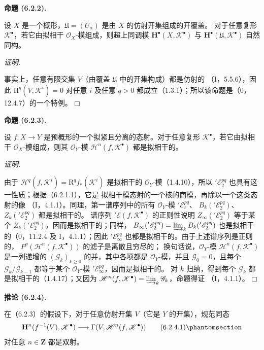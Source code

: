 \documentclass[UTF8,fontset=none,11pt,oneside,openany]{ctexbook}
\providecommand{\square}{\mdlgwhtsquare}
\newenvironment{proposition}[1][]{%
  \par\medskip\noindent\textbf{命题 (#1).}\ %
}{\par}
\newenvironment{corollary}[1][]{%
  \par\medskip\noindent\textbf{推论 (#1).}\ %
}{\par}
\newenvironment{proof}{%
  \par\smallskip\noindent\textit{证明.}\ %
}{\hfill$\square$\par}
\newcommand{\oldpage}[2][]{%
  \hypertarget{ega-source-page-#1-#2}{}%
  \marginnote{\scriptsize\textbf{#1}~|~#2}\ignorespaces}
\let\EGAOriginalLabel\label
\renewcommand{\label}[1]{\phantomsection\EGAOriginalLabel{#1}}
\begin{document}
\begin{proposition}[6.2.2]
设 $X$ 是一个概形，$\mathfrak U=(U_\alpha)$ 是由 $X$ 的仿射开集组成的开覆盖。
对于任意复形 $\mathscr K^\bullet$，若它由拟相干 $\mathscr O_X$-模组成，则超上同调模
$\mathbf H^\bullet(X,\mathscr K^\bullet)$ 与
$\mathbf H^\bullet(\mathfrak U,\mathscr K^\bullet)$ 自然同构。
\end{proposition}

\begin{proof}
事实上，任意有限交集 $V$（由覆盖 $\mathfrak U$ 中的开集构成）都是仿射的
（I，5.5.6），因此 $\mathrm H^q(V,\mathscr K^i)=0$ 对任意 $i$ 及任意
$q>0$ 都成立（1.3.1）；所以该命题是（0，12.4.7）的一个特例。
\end{proof}

\begin{proposition}[6.2.3]
设 $f:X\to Y$ 是预概形的一个拟紧且分离的态射。对于任意复形
$\mathscr K^\bullet$，若它由拟相干 $\mathscr O_X$-模组成，则其
$\mathscr O_Y$-模 $\mathscr H^n(f,\mathscr K^\bullet)$ 都是拟相干的。
\end{proposition}

\begin{proof}
由于 $\mathscr H^q(f,\mathscr K^i)=\mathrm R^q f_*(\mathscr K^i)$
是拟相干的 $\mathscr O_Y$-模（1.4.10），所以
$'\mathscr E_2^{pq}$ 也具有这一性质；根据（6.2.1.1），它是
拟相干模态射的一个核的商模，再除以一个这类态射的像
（I，4.1.1）。同理，第一谱序列中的所有
$\mathscr O_Y$-模 $'\mathscr E_r^{pq}$、
$B_k('\mathscr E_2^{pq})$、$Z_k('\mathscr E_2^{pq})$ 都是拟相干的。
谱序列 $'\mathscr E(f,\mathscr K^\bullet)$ 的正则性说明
$Z_\infty('\mathscr E_2^{pq})$ 等于某个
$Z_k('\mathscr E_2^{pq})$，因而是拟相干的；同样，
$B_\infty('\mathscr E_2^{pq})=\varinjlim_k B_k('\mathscr E_2^{pq})$
也是拟相干的（0，11.2.4 及 I，4.1.1）；因此
$'\mathscr E_\infty^{pq}$ 也都是拟相干的。由于上述谱序列是正则的，
$F^p(\mathscr H^n(f,\mathscr K^\bullet))$ 的滤子是离散且穷尽的；
换句话说，$\mathscr O_Y$-模
$\mathscr H^n(f,\mathscr K^\bullet)$ 是一列递增的
$(\mathscr G_k)_{k\geq0}$ 的并，其中各项都是 $\mathscr O_Y$-模，并且
$\mathscr G_0=0$，且每个 $\mathscr G_k/\mathscr G_{k-1}$ 都等于某个
$\mathscr O_Y$-模 $'\mathscr E_\infty^{pq}$，因而是拟相干的。
对 $k$ 归纳，得到每个 $\mathscr G_k$ 都是拟相干的（1.4.17）；又因为
$\mathscr H^n(f,\mathscr K^\bullet)=\varinjlim_k\mathscr G_k$，命题得证
（I，4.1.1）。
\end{proof}
\oldpage[III]{140}

\begin{corollary}[6.2.4]
在（6.2.3）的假设下，对于任意仿射开集 $V$（它是 $Y$ 的开集），规范同态
\[
  \mathbf H^n(f^{-1}(V),\mathscr K^\bullet)
  \longrightarrow
  \Gamma(V,\mathscr H^n(f,\mathscr K^\bullet))
  \tag{6.2.4.1}\label{III.6.2.4.1-fr}
\]
对任意 $n\in\mathbf Z$ 都是双射。
\end{corollary}
\end{document}
